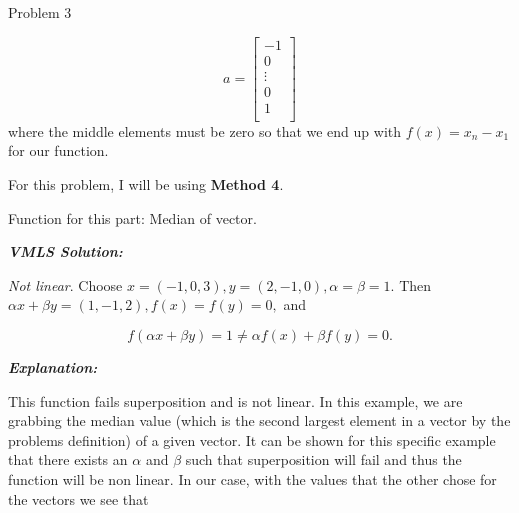 \begin{problem}{Problem 3}
\begin{highlight}
        \begin{equation}
            a = 
            \begin{bmatrix}
                - 1 \\
                0 \\
                \vdots \\
                0 \\
                1 \\
            \end{bmatrix}
        \end{equation}
        where the middle elements must be zero so that we end up with $f(x) = x_{n} - x_{1}$ for our function. 
    \end{highlight}

    \begin{highlight}
        For this problem, I will be using \textbf{Method 4}. \vspace*{1em}

        Function for this part: Median of vector. \vspace*{1em}

        \textbf{\textit{VMLS Solution:}} \vspace*{1em}

        \textit{Not linear}. Choose $x = (-1,0,3), y = (2,-1,0), \alpha = \beta = 1$. Then $\alpha x + \beta y = (1,-1,2), f(x) = f(y) = 0,$ and

        \begin{equation}
            f(\alpha x + \beta y) = 1 \neq \alpha f(x) + \beta f(y) = 0.
        \end{equation}

        \textbf{\textit{Explanation:}} \vspace*{1em}

        This function fails superposition and is not linear. In this example, we are grabbing the median value (which is the second largest element in a vector by the problems definition)
        of a given vector. It can be shown for this specific example that there exists an $\alpha$ and $\beta$ such that superposition will fail and thus the function will be non linear.
        In our case, with the values that the other chose for the vectors we see that


\end{highlight}
\end{problem}
